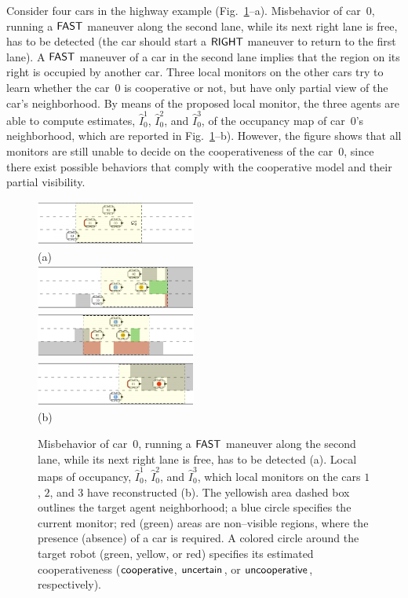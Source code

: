 Consider four cars in the highway example (Fig.~\ref{fig:highway_faulty_a}--a). Misbehavior of car~$0$, running a $\mfast$ maneuver along the second lane, while its next right lane is free, has to be detected (the car should start a $\mright$ maneuver to return to the first lane). A $\mfast$ maneuver of a car in the second lane implies that the region on its right is occupied by another car. Three local monitors on the other cars try to learn whether the car~$0$ is cooperative or not, but have only partial view of the car's neighborhood. By means of the proposed local monitor, the three agents are able to compute estimates, $\hat{I}_{0}^{1}$, $\hat{I}_{0}^{2}$, and $\hat{I}_{0}^{3}$, of the occupancy map of car~$0$'s neighborhood, which are reported in Fig.~\ref{fig:highway_faulty_a}--b). However, the figure shows that all monitors are still unable to decide on the cooperativeness of the car~$0$, since there exist possible behaviors that comply with the cooperative model and their partial visibility.
\begin{figure}
\centering
\includegraphics[width=0.47\textwidth]{images/simulation_01_F_a.pdf} \\
(a) \\
 \vspace{2mm}
\includegraphics[width=0.47\textwidth]{images/simulation_01_A01_a.pdf} \\
\includegraphics[width=0.47\textwidth]{images/simulation_01_A02_a.pdf} \\
\includegraphics[width=0.47\textwidth]{images/simulation_01_A03_a.pdf} \\
(b)
\caption{Misbehavior of car~$0$, running a $\mfast$ maneuver along the second lane, while its next right lane is free, has to be detected (a). Local maps of occupancy, $\hat{I}_{0}^{1}$, $\hat{I}_{0}^{2}$, and $\hat{I}_{0}^{3}$, which local monitors on the cars $1$, $2$, and $3$ have reconstructed (b). The yellowish area dashed box outlines the target agent neighborhood; a blue circle specifies the current monitor; red (green) areas are non--visible regions, where the presence (absence) of a car is required. A colored circle around the target robot (green, yellow, or red) specifies its estimated cooperativeness ($\mathsf{cooperative}$, $\mathsf{uncertain}$, or $\mathsf{uncooperative}$, respectively).}
\label{fig:highway_faulty_a}
\end{figure}


